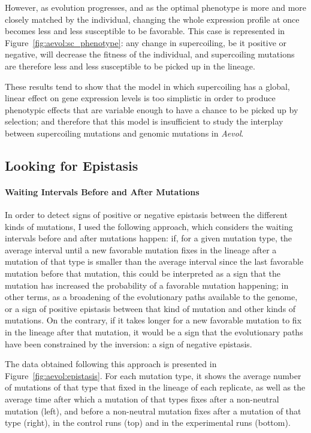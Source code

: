 However, as evolution progresses, and as the optimal phenotype is more and more closely matched by the individual, changing the whole expression profile at once becomes less and less susceptible to be favorable.
This case is represented in Figure~\ref{fig:aevol:sc_phenotype}: any change in supercoiling, be it positive or negative, will decrease the fitness of the individual, and supercoiling mutations are therefore less and less susceptible to be picked up in the lineage.

These results tend to show that the model in which supercoiling has a global, linear effect on gene expression levels is too simplistic in order to produce phenotypic effects that are variable enough to have a chance to be picked up by selection; and therefore that this model is insufficient to study the interplay between supercoiling mutations and genomic mutations in \emph{Aevol}.

\subsection{Looking for Epistasis}

\paragraph{Waiting Intervals Before and After Mutations}
In order to detect signs of positive or negative epistasis between the different kinds of mutations, I used the following approach, which considers the waiting intervals before and after mutations happen: if, for a given mutation type, the average interval until a new favorable mutation fixes in the lineage after a mutation of that type is smaller than the average interval since the last favorable mutation before that mutation, this could be interpreted as a sign that the mutation has increased the probability of a favorable mutation happening; in other terms, as a broadening of the evolutionary paths available to the genome, or a sign of positive epistasis between that kind of mutation and other kinds of mutations.
On the contrary, if it takes longer for a new favorable mutation to fix in the lineage after that mutation, it would be a sign that the evolutionary paths have been constrained by the inversion: a sign of negative epistasis.

The data obtained following this approach is presented in Figure~\ref{fig:aevol:epistasis}.
For each mutation type, it shows the average number of mutations of that type that fixed in the lineage of each replicate, as well as the average time after which a mutation of that types fixes after a non-neutral mutation (left), and before a non-neutral mutation fixes after a mutation of that type (right), in the control runs (top) and in the experimental runs (bottom).

